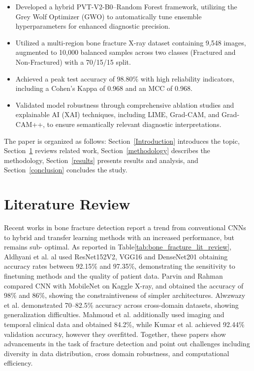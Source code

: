\documentclass{styles/svproc}
\begin{document}
\begin{itemize} 
\item Developed a hybrid PVT-V2-B0–Random Forest framework, utilizing the Grey Wolf Optimizer (GWO) to automatically tune ensemble hyperparameters for enhanced diagnostic precision. 
\item Utilized a multi-region bone fracture X-ray dataset containing 9,548 images, augmented to 10,000 balanced samples across two classes (Fractured and Non-Fractured) with a 70/15/15 split. 
\item Achieved a peak test accuracy of 98.80\% with high reliability indicators, including a Cohen's Kappa of 0.968 and an MCC of 0.968. 
\item Validated model robustness through comprehensive ablation studies and explainable AI (XAI) techniques, including LIME, Grad-CAM, and Grad-CAM++, to ensure semantically relevant diagnostic interpretations. 
\end{itemize}

The paper is organized as follows: Section~\ref{Introduction} introduces the topic, Section~\ref{Literature} reviews related work, Section~\ref{methodology} describes the methodology, Section~\ref{results} presents results and analysis, and Section~\ref{conclusion} concludes the study.


\section{Literature Review} \label{Literature}


Recent works in bone fracture detection report a trend from conventional CNNs to hybrid and transfer learning methods with an increased performance, but remains sub- optimal. As reported in Table\ref{tab:bone_fracture_lit_review}, Aldhyani et al. \cite{Aldhyani2024} al used ResNet152V2, VGG16 and DenseNet201 obtaining accuracy rates between 92.15\% and 97.35\%, demonstrating the sensitivity to finetuning methods and the quality of patient data. Parvin and Rahman\cite{Parvin2023} compared CNN with MobileNet on Kaggle X-ray, and obtained the accuracy of 98\% and 86\%, showing the constraintiveness of simpler architectures. Alwzwazy et al. \cite{Alwzwazy2025} demonstrated 70–82.5\% accuracy across cross-domain datasets, showing generalization difficulties. Mahmoud et al. \cite{Mahmoud2025} additionally used imaging and temporal clinical data and obtained 84.2\%, while Kumar et al. \cite{Kumar2020} achieved 92.44\% validation accuracy, however they overfitted. Together, these papers show advancements in the task of fracture detection and point out challenges including diversity in data distribution, cross domain robustness, and computational efficiency.
\end{document}
